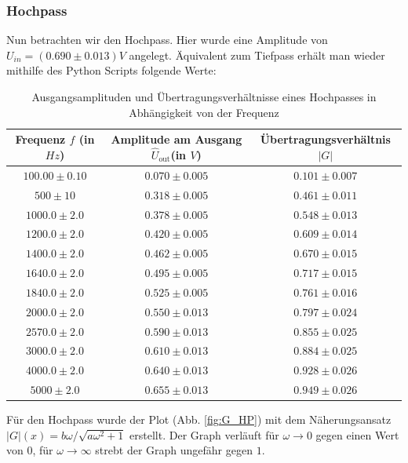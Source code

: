 \documentclass{report}
\begin{document}
\subsubsection{Hochpass}
Nun betrachten wir den Hochpass. Hier wurde eine Amplitude von $U_{in} = (0.690 \pm 0.013) \si{V}$ angelegt. Äquivalent zum Tiefpass erhält man wieder mithilfe des Python Scripts folgende Werte:
\begin{table}[H]
    \centering
    \label{tab:HPAmps}
    \begin{tabular}{| c | c | c |}
        \hline
        Frequenz $f$ (in $\si{Hz}$) &  Amplitude am Ausgang $\hat{U}_{\mathrm{out}}$(in $V$) & Übertragungsverhältnis $\left\lvert G \right\rvert$\\
        \hline
        $100.00 \pm 0.10$ & $0.070 \pm 0.005$ & $0.101 \pm 0.007$ \\
        $500 \pm 10$ & $0.318 \pm 0.005$ & $0.461 \pm 0.011$ \\
        $1000.0 \pm 2.0$ & $0.378 \pm 0.005$ & $0.548 \pm 0.013$ \\
        $1200.0 \pm 2.0$ & $0.420 \pm 0.005$ & $0.609 \pm 0.014$ \\
        $1400.0 \pm 2.0$ & $0.462 \pm 0.005$ & $0.670 \pm 0.015$ \\
        $1640.0 \pm 2.0$ & $0.495 \pm 0.005$ & $0.717 \pm 0.015$ \\
        $1840.0 \pm 2.0$ & $0.525 \pm 0.005$ & $0.761 \pm 0.016$ \\
        $2000.0 \pm 2.0$ & $0.550 \pm 0.013$ & $0.797 \pm 0.024$ \\
        $2570.0 \pm 2.0$ & $0.590 \pm 0.013$ & $0.855 \pm 0.025$ \\
        $3000.0 \pm 2.0$ & $0.610 \pm 0.013$ & $0.884 \pm 0.025$ \\
        $4000.0 \pm 2.0$ & $0.640 \pm 0.013$ & $0.928 \pm 0.026$ \\
        $5000 \pm 2.0$ & $0.655 \pm 0.013$ & $0.949 \pm 0.026$ \\
        \hline
    \end{tabular}
    \caption{Ausgangsamplituden und Übertragungsverhältnisse eines Hochpasses in Abhängigkeit von der Frequenz}
\end{table}
\noindent
Für den Hochpass wurde der Plot (Abb. \ref{fig:G_HP}) mit dem Näherungsansatz $\left\lvert G \right\rvert(x) = b\omega/\sqrt{a\omega^2 + 1}$ erstellt.
Der Graph verläuft für $\omega \to 0$ gegen einen Wert von $0$, für $\omega \to \infty$ strebt der Graph ungefähr gegen $1$. \\
\end{document}
